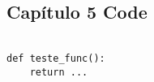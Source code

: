 \documentclass[a4paper,12pt,openright,oneside]{book}
\begin{document}
\begin{appendices}
\chapter{Capítulo 5 Code}

\begin{lstlisting}

def teste_func():
	return ...

\end{lstlisting}

\end{appendices}
\end{document}
